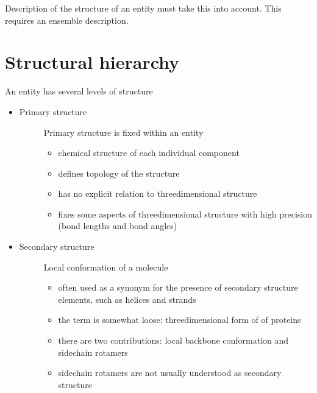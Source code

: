 \documentclass[letterpaper,10pt,english]{sphinxmanual}
\begin{document}
Description of the structure of an entity must take this into account. This requires an ensemble description.


\section{Structural hierarchy}
\label{\detokenize{functional_entity:structural-hierarchy}}
An entity has several levels of structure
\begin{itemize}
\item {} \begin{description}
\item[{Primary structure}] \leavevmode
Primary structure is fixed within an entity
\begin{itemize}
\item {} 
chemical structure of each individual component

\item {} 
defines topology of the structure

\item {} 
has no explicit relation to three\sphinxhyphen{}dimensional structure

\item {} 
fixes some aspects of three\sphinxhyphen{}dimensional structure with high precision (bond lengths and bond angles)

\end{itemize}

\end{description}

\item {} \begin{description}
\item[{Secondary structure}] \leavevmode
Local conformation of a molecule
\begin{itemize}
\item {} 
often used as a synonym for the presence of secondary structure elements, such as helices and strands

\item {} 
the term is somewhat loose: three\sphinxhyphen{}dimensional form of  of proteins

\item {} 
there are two contributions: local backbone conformation and sidechain rotamers

\item {} 
sidechain rotamers are not usually understood as secondary structure


\end{itemize}
\end{description}
\end{itemize}
\end{document}
